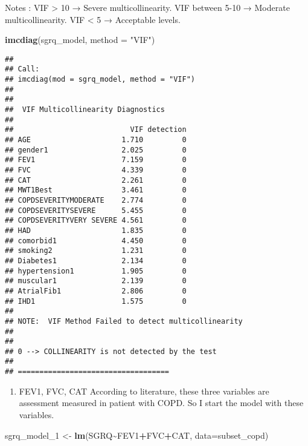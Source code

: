 \documentclass[
]{article}
\newenvironment{Shaded}{\begin{snugshade}}{\end{snugshade}}
\newcommand{\AttributeTok}[1]{\textcolor[rgb]{0.13,0.29,0.53}{#1}}
\newcommand{\FunctionTok}[1]{\textcolor[rgb]{0.13,0.29,0.53}{\textbf{#1}}}
\newcommand{\NormalTok}[1]{#1}
\newcommand{\OtherTok}[1]{\textcolor[rgb]{0.56,0.35,0.01}{#1}}
\newcommand{\SpecialCharTok}[1]{\textcolor[rgb]{0.81,0.36,0.00}{\textbf{#1}}}
\newcommand{\StringTok}[1]{\textcolor[rgb]{0.31,0.60,0.02}{#1}}
\providecommand{\tightlist}{%
  \setlength{\itemsep}{0pt}\setlength{\parskip}{0pt}}
\begin{document}
Notes : VIF \textgreater{} 10 → Severe multicollinearity. VIF between
5-10 → Moderate multicollinearity. VIF \textless{} 5 → Acceptable
levels.

\begin{Shaded}
\begin{Highlighting}[]
\FunctionTok{imcdiag}\NormalTok{(sgrq\_model, }\AttributeTok{method =} \StringTok{"VIF"}\NormalTok{)}
\end{Highlighting}
\end{Shaded}

\begin{verbatim}
## 
## Call:
## imcdiag(mod = sgrq_model, method = "VIF")
## 
## 
##  VIF Multicollinearity Diagnostics
## 
##                           VIF detection
## AGE                     1.710         0
## gender1                 2.025         0
## FEV1                    7.159         0
## FVC                     4.339         0
## CAT                     2.261         0
## MWT1Best                3.461         0
## COPDSEVERITYMODERATE    2.774         0
## COPDSEVERITYSEVERE      5.455         0
## COPDSEVERITYVERY SEVERE 4.561         0
## HAD                     1.835         0
## comorbid1               4.450         0
## smoking2                1.231         0
## Diabetes1               2.134         0
## hypertension1           1.905         0
## muscular1               2.139         0
## AtrialFib1              2.806         0
## IHD1                    1.575         0
## 
## NOTE:  VIF Method Failed to detect multicollinearity
## 
## 
## 0 --> COLLINEARITY is not detected by the test
## 
## ===================================
\end{verbatim}

\begin{enumerate}
\def\labelenumi{\arabic{enumi}.}
\tightlist
\item
  FEV1, FVC, CAT According to literature, these three variables are
  assessment measured in patient with COPD. So I start the model with
  these variables.
\end{enumerate}

\begin{Shaded}
\begin{Highlighting}[]
\NormalTok{sgrq\_model\_1 }\OtherTok{\textless{}{-}} \FunctionTok{lm}\NormalTok{(SGRQ}\SpecialCharTok{\textasciitilde{}}\NormalTok{FEV1}\SpecialCharTok{+}\NormalTok{FVC}\SpecialCharTok{+}\NormalTok{CAT, }\AttributeTok{data=}\NormalTok{subset\_copd)}
\end{Highlighting}
\end{Shaded}
\end{document}
